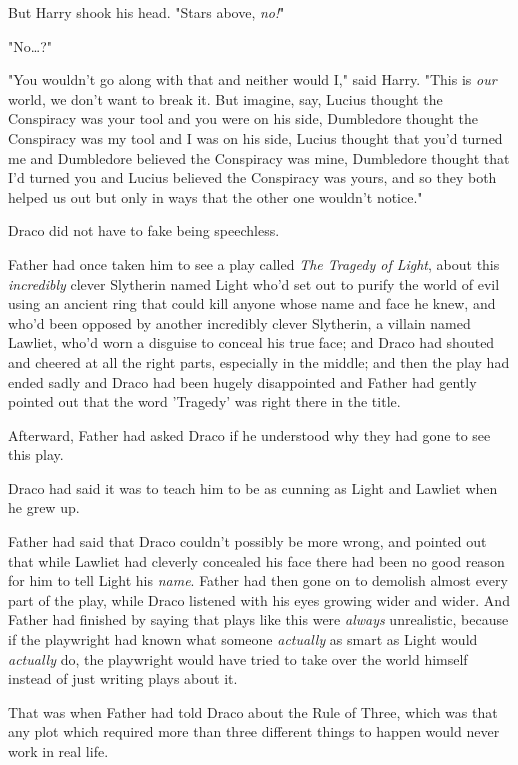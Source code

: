 But Harry shook his head. "Stars above, \emph{no!}"

"No{\ldots}?"

"You wouldn't go along with that and neither would I," said Harry. "This is 
\emph{our} world, we don't want to break it. But imagine, say, Lucius thought 
the Conspiracy was your tool and you were on his side, Dumbledore thought the 
Conspiracy was my tool and I was on his side, Lucius thought that you'd turned 
me and Dumbledore believed the Conspiracy was mine, Dumbledore thought that I'd 
turned you and Lucius believed the Conspiracy was yours, and so they both 
helped us out but only in ways that the other one wouldn't notice."

Draco did not have to fake being speechless.

Father had once taken him to see a play called \emph{The Tragedy of Light}, 
about this \emph{incredibly} clever Slytherin named Light who'd set out to 
purify the world of evil using an ancient ring that could kill anyone whose 
name and face he knew, and who'd been opposed by another incredibly clever 
Slytherin, a villain named Lawliet, who'd worn a disguise to conceal his true 
face; and Draco had shouted and cheered at all the right parts, especially in 
the middle; and then the play had ended sadly and Draco had been hugely 
disappointed and Father had gently pointed out that the word 'Tragedy' was 
right there in the title.

Afterward, Father had asked Draco if he understood why they had gone to see 
this play.

Draco had said it was to teach him to be as cunning as Light and Lawliet when 
he grew up.

Father had said that Draco couldn't possibly be more wrong, and pointed out 
that while Lawliet had cleverly concealed his face there had been no good 
reason for him to tell Light his \emph{name}. Father had then gone on to 
demolish almost every part of the play, while Draco listened with his eyes 
growing wider and wider. And Father had finished by saying that plays like this 
were \emph{always} unrealistic, because if the playwright had known what 
someone \emph{actually} as smart as Light would \emph{actually} do, the 
playwright would have tried to take over the world himself instead of just 
writing plays about it.

That was when Father had told Draco about the Rule of Three, which was that any 
plot which required more than three different things to happen would never work 
in real life.

